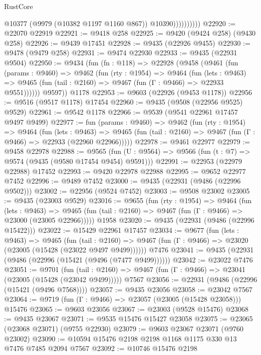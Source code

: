 \begin{lexlean}{RustCore}
\begin{coremodule}
                        @10377
                        (@9979 (@10382 @1197 @1160 @867))
                        @10390))))))))))
@22920 := @22070 @22919
@22921 := @9418 @258
@22925 := @9420 (@9424 @258) (@9430 @258)
@22926 := @9439 @17451
@22928 := @9435 (@22926 @9455)
@22930 := @9478 (@9479 @258)
@22931 := @9474 @22930
@22933 := @9435 (@22931 @9504)
@22950 := @9434
    (fun (fn : @118) =>
    @22928
      (@9458
        (@9461
          (fun (params : @9460) =>
          @9462
            (fun (rty : @1954) =>
            @9464
              (fun (lets : @9463) =>
              @9465 (fun (tail : @2160) => @9467 (fun (Γ : @9466) => @22933 @9551))))))
        @9597))
    @1178
@22953 := @9603 (@22926 (@9453 @1178))
@22956 := @9516 (@9517 @1178) @17454
@22960 := @9435 (@9508 (@22956 @9525) @9529)
@22961 := @9542 @1178
@22966 := @9539 (@9541 @22961 @17457 @9497 @9499)
@22977 := fun (params : @9460) =>
  @9462
    (fun (rty : @1954) =>
    @9464
      (fun (lets : @9463) =>
      @9465 (fun (tail : @2160) => @9467 (fun (Γ : @9466) => @22933 (@22960 @22966)))))
@22978 := @9461 @22977
@22979 := @9458 @22978
@22988 := @9565
    (fun (U : @9564) => @9566 (fun (t : @7) => @9574 (@9435 (@9580 @17454 @9454) @9591)))
@22991 := @22953 (@22979 @22988) @17452
@22993 := @9420 @22978 @22988
@22995 := @9652 @22977 @7452
@22996 := @9489 @7452
@23000 := @9435 (@22931 (@9486 (@22996 @9502)))
@23002 := @22956 (@9524 @7452)
@23003 := @9508 @23002
@23005 := @9435 (@23003 @9529)
@23016 := @9655
    (fun (rty : @1954) =>
    @9464
      (fun (lets : @9463) =>
      @9465 (fun (tail : @2160) => @9467 (fun (Γ : @9466) => @23000 (@23005 @22966)))))
    @1958
@23020 := @9435 (@22931 (@9486 (@22996 @15422)))
@23022 := @15429 @22961 @17457
@23034 := @9677
    (fun (lets : @9463) =>
    @9465
      (fun (tail : @2160) =>
      @9467 (fun (Γ : @9466) => @23020 (@23005 (@15428 (@23022 @9497 @9499))))))
    @7476
@23041 := @9435 (@22931 (@9486 (@22996 (@15421 (@9496 (@7477 @9499))))))
@23042 := @23022 @7476
@23051 := @9701
    (fun (tail : @2160) => @9467 (fun (Γ : @9466) => @23041 (@23005 (@15428 (@23042 @9499)))))
    @7567
@23056 := @22931 (@9486 (@22996 (@15421 (@9496 @7568))))
@23057 := @9435 @23056
@23058 := @23042 @7567
@23064 := @9719 (fun (Γ : @9466) => @23057 (@23005 (@15428 @23058))) @15476
@23065 := @9603 @23056
@23067 := @23003 (@9528 @15476)
@23068 := @9435 @23067
@23071 := @9535 @15476 @15427 @23058
@23075 := @23065 (@23068 @23071) (@9755 @22930)
@23079 := @9603 @23067 @23071 (@9760 @23002)
@23090 := @10594 @15476 @2198 @2198 @1168 @1175 @330 @13 @7476 @7485 @2094 @7567
@23092 := @10746 @15476 @2198

\end{coremodule}
\end{lexlean}
